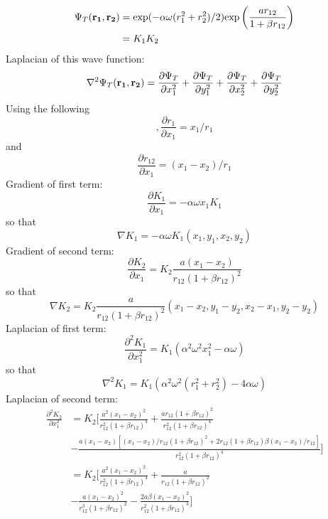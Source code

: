 \documentclass[english, a4paper]{article}
\begin{document}
\begin{align}
 \Psi_T({\bf r_1}, {\bf r_2}) &= \textrm{exp}(-\alpha \omega(r_1^2 + r_2^2)/2)
 \textrm{exp}\left(\frac{a r_{12}}{1 + \beta r_{12}}\right) \\
 &= K_1K_2
\end{align}
Laplacian of this wave function:
\begin{equation}
 \nabla^2 \Psi_T({\bf r_1}, {\bf r_2}) = \frac{\partial \Psi_T}{\partial x_1^2} + 
 \frac{\partial \Psi_T}{\partial y_1^2} + \frac{\partial \Psi_T}{\partial x_2^2} +
 \frac{\partial \Psi_T}{\partial y_2^2}
\end{equation}
Using the following
\begin{equation},
 \frac{\partial r_1}{\partial x_1} = x_1/r_1
\end{equation}
and 
\begin{equation}
 \frac{\partial r_{12}}{\partial x_1} = (x_1 - x_2)/r_1
\end{equation}
Gradient of first term:
\begin{equation}
 \frac{\partial K_1}{\partial x_1} = -\alpha \omega x_1 K_1
\end{equation}
so that
\begin{equation}
 \nabla K_1 = -\alpha \omega K_1 (x_1, y_1, x_2, y_2)
\end{equation}
Gradient of second term:
\begin{equation}
 \frac{\partial K_2}{\partial x_1} = K_2 \frac{a(x_1 - x_2)}{r_{12}(1 + \beta r_{12})^2}
\end{equation}
so that
\begin{equation}
 \nabla K_2 = K_2 \frac{a}{r_{12}(1 + \beta r_{12})^2} (x_1 - x_2, y_1 - y_2, x_2 - x_1, y_2 - y_2)
\end{equation}
Laplacian of first term:
\begin{equation}
 \frac{\partial^2 K_1}{\partial x_1^2} = K_1 (\alpha^2 \omega^2 x_1^2 -\alpha \omega )  
\end{equation}
so that
\begin{equation}
 \nabla^2 K_1 = K_1 (\alpha^2 \omega^2 (r_1^2 + r_2^2) - 4\alpha \omega)
\end{equation}
Laplacian of second term:
\begin{align}
 \frac{\partial^2 K_2}{\partial x_1^2} &= K_2 \Biggr[\frac{a^2(x_1-x_2)^2}{r_{12}^2(1 + \beta r_{12})^4} +
 \frac{ar_{12}(1 + \beta r_{12})^2}{r_{12}^2(1 + \beta r_{12})^4} \\
 &-\frac{a(x_1 - x_2)[(x_1-x_2)/r_{12} (1 + \beta r_{12})^2 + 2r_{12}(1 + \beta r_{12})\beta(x_1-x_2)/r_{12}]}
 {r_{12}^2(1 + \beta r_{12})^4} \Biggr] \\
 &= K_2 \Biggr[\frac{a^2(x_1-x_2)^2}{r_{12}^2(1 + \beta r_{12})^4} +
 \frac{a}{r_{12}(1 + \beta r_{12})^2} \\
 &-\frac{a(x_1 - x_2)^2}{r_{12}^3(1 + \beta r_{12})^2}
 - \frac{2a\beta(x_1 - x_2)^2} {r_{12}^2(1 + \beta r_{12})^3} \Biggr]
\end{align}
\end{document}

